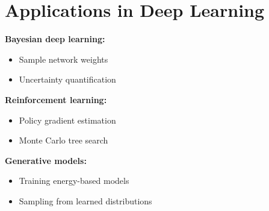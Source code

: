 
\section{Applications in Deep Learning }
\label{sec:mc-applications}

\textbf{Bayesian deep learning:}
\begin{itemize}
    \item Sample network weights
    \item Uncertainty quantification
\end{itemize}

\textbf{Reinforcement learning:}
\begin{itemize}
    \item Policy gradient estimation
    \item Monte Carlo tree search
\end{itemize}

\textbf{Generative models:}
\begin{itemize}
    \item Training energy-based models
    \item Sampling from learned distributions
\end{itemize}




